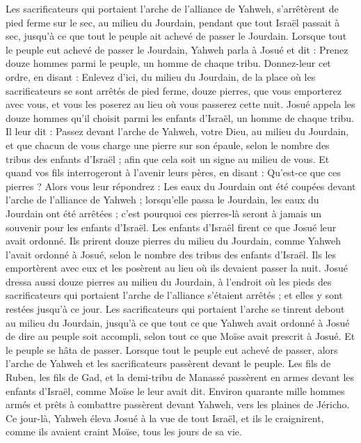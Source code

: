 \begin{multicols}{2}
Les sacrificateurs qui portaient l’arche de l’alliance de Yahweh, s’arrêtèrent de pied ferme sur le sec, au milieu du Jourdain, pendant que tout Israël passait à sec, jusqu’à ce que tout le peuple ait achevé de passer le Jourdain.
\VerseOne{}Lorsque tout le peuple eut achevé de passer le Jourdain, Yahweh parla à Josué et dit :
Prenez douze hommes parmi le peuple, un homme de chaque tribu.
Donnez-leur cet ordre, en disant : Enlevez d’ici, du milieu du Jourdain, de la place où les sacrificateurs se sont arrêtés de pied ferme, douze pierres, que vous emporterez avec vous, et vous les poserez au lieu où vous passerez cette nuit.
Josué appela les douze hommes qu’il choisit parmi les enfants d’Israël, un homme de chaque tribu.
Il leur dit : Passez devant l’arche de Yahweh, votre Dieu, au milieu du Jourdain, et que chacun de vous charge une pierre sur son épaule, selon le nombre des tribus des enfants d’Israël ;
afin que cela soit un signe au milieu de vous. Et quand vos fils interrogeront à l’avenir leurs pères, en disant : Qu’est-ce que ces pierres ?
Alors vous leur répondrez : Les eaux du Jourdain ont été coupées devant l’arche de l’alliance de Yahweh ; lorsqu’elle passa le Jourdain, les eaux du Jourdain ont été arrêtées ; c’est pourquoi ces pierres-là seront à jamais un souvenir pour les enfants d’Israël.
Les enfants d’Israël firent ce que Josué leur avait ordonné. Ils prirent douze pierres du milieu du Jourdain, comme Yahweh l’avait ordonné à Josué, selon le nombre des tribus des enfants d’Israël. Ils les emportèrent avec eux et les posèrent au lieu où ils devaient passer la nuit.
Josué dressa aussi douze pierres au milieu du Jourdain, à l’endroit où les pieds des sacrificateurs qui portaient l’arche de l’alliance s’étaient arrêtés ; et elles y sont restées jusqu’à ce jour.
Les sacrificateurs qui portaient l’arche se tinrent debout au milieu du Jourdain, jusqu’à ce que tout ce que Yahweh avait ordonné à Josué de dire au peuple soit accompli, selon tout ce que Moïse avait prescrit à Josué. Et le peuple se hâta de passer.
Lorsque tout le peuple eut achevé de passer, alors l’arche de Yahweh et les sacrificateurs passèrent devant le peuple.
Les fils de Ruben, les fils de Gad, et la demi-tribu de Manassé passèrent en armes devant les enfants d’Israël, comme Moïse le leur avait dit.
Environ quarante mille hommes armés et prêts à combattre passèrent devant Yahweh, vers les plaines de Jéricho.
Ce jour-là, Yahweh éleva Josué à la vue de tout Israël, et ils le craignirent, comme ils avaient craint Moïse, tous les jours de sa vie.

\end{multicols}
